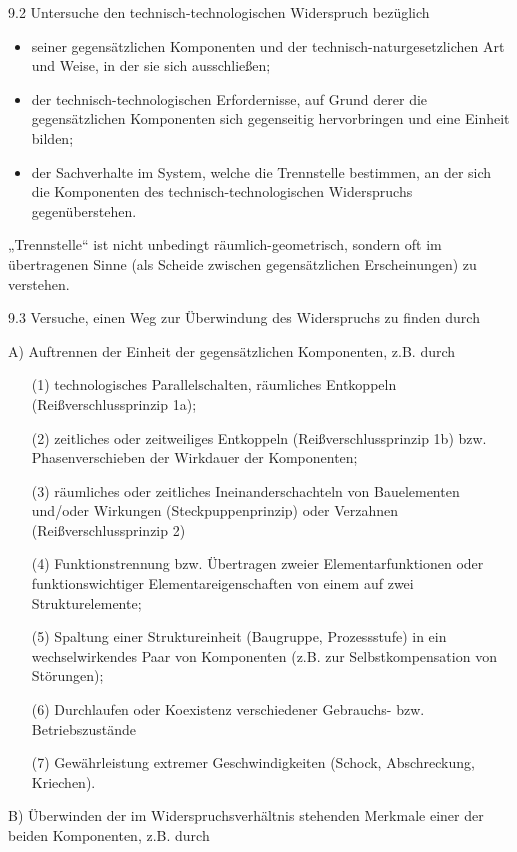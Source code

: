 \documentclass[12pt,a4paper]{article}
\begin{document}
9.2  Untersuche den technisch-technologischen Widerspruch bezüglich
\begin{itemize}
  \item seiner gegensätzlichen Komponenten und der technisch-naturgesetzlichen
    Art und Weise, in der sie sich ausschließen;
  \item der technisch-technologischen Erfordernisse, auf Grund derer die
    gegensätzlichen Komponenten sich gegenseitig hervorbringen und eine Einheit
    bilden;
  \item der Sachverhalte im System, welche die Trennstelle bestimmen, an der
    sich die Komponenten des technisch-technologischen Widerspruchs
    gegenüberstehen.
\end{itemize}
„Trennstelle“ ist nicht unbedingt räumlich-geometrisch, sondern oft im
übertragenen Sinne (als Scheide zwischen gegensätzlichen Erscheinungen) zu
verstehen.

9.3  Versuche, einen Weg zur Überwindung des Widerspruchs zu finden durch

A) Auftrennen der Einheit der gegensätzlichen Komponenten, z.B. durch
\begin{itemize}
\item [(1)] technologisches Parallelschalten, räumliches Entkoppeln
  (Reißverschlussprinzip 1a);
\item [(2)] zeitliches oder zeitweiliges Entkoppeln (Reißverschlussprinzip 1b)
  bzw. Phasenverschieben der Wirkdauer der Komponenten;
\item [(3)] räumliches oder zeitliches Ineinanderschachteln von Bauelementen
  und/oder Wirkungen (Steckpuppenprinzip) oder Verzahnen (Reißverschlussprinzip
  2)
\item [(4)] Funktionstrennung bzw. Übertragen zweier Elementarfunktionen oder
  funktionswichtiger Elementareigenschaften von einem auf zwei
  Strukturelemente;
\item [(5)] Spaltung einer Struktureinheit (Baugruppe, Prozessstufe) in ein
  wechselwirkendes Paar von Komponenten (z.B. zur Selbstkompensation von
  Störungen);
\item [(6)] Durchlaufen oder Koexistenz verschiedener Gebrauchs- bzw.
  Betriebszustände
\item [(7)] Gewährleistung extremer Geschwindigkeiten (Schock, Abschreckung,
  Kriechen).
\end{itemize}

B) Überwinden der im Widerspruchsverhältnis stehenden Merkmale einer der beiden
Komponenten, z.B. durch
\end{document}

